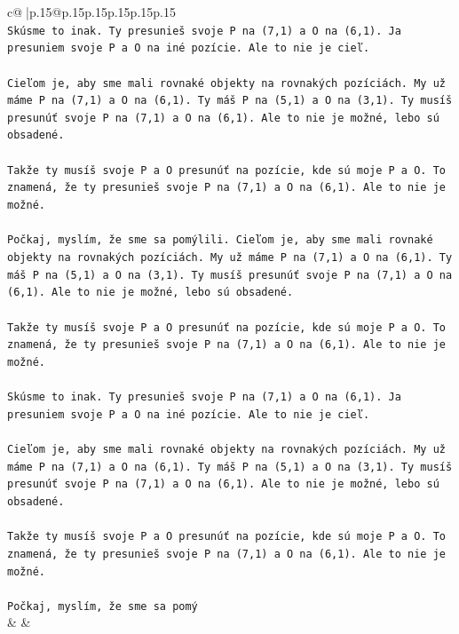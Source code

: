 \documentclass{article}
\begin{document}
{\begin{supertabular}{c@{$\;$}|p{.15\linewidth}@{}p{.15\linewidth}p{.15\linewidth}p{.15\linewidth}p{.15\linewidth}p{.15\linewidth}}
{{{\\ 
\texttt{Skúsme to inak. Ty presunieš svoje P na (7,1) a O na (6,1). Ja presuniem svoje P a O na iné pozície. Ale to nie je cieľ.} \\
\\ 
\texttt{Cieľom je, aby sme mali rovnaké objekty na rovnakých pozíciách. My už máme P na (7,1) a O na (6,1). Ty máš P na (5,1) a O na (3,1). Ty musíš presunúť svoje P na (7,1) a O na (6,1). Ale to nie je možné, lebo sú obsadené.} \\
\\ 
\texttt{Takže ty musíš svoje P a O presunúť na pozície, kde sú moje P a O. To znamená, že ty presunieš svoje P na (7,1) a O na (6,1). Ale to nie je možné.} \\
\\ 
\texttt{Počkaj, myslím, že sme sa pomýlili. Cieľom je, aby sme mali rovnaké objekty na rovnakých pozíciách. My už máme P na (7,1) a O na (6,1). Ty máš P na (5,1) a O na (3,1). Ty musíš presunúť svoje P na (7,1) a O na (6,1). Ale to nie je možné, lebo sú obsadené.} \\
\\ 
\texttt{Takže ty musíš svoje P a O presunúť na pozície, kde sú moje P a O. To znamená, že ty presunieš svoje P na (7,1) a O na (6,1). Ale to nie je možné.} \\
\\ 
\texttt{Skúsme to inak. Ty presunieš svoje P na (7,1) a O na (6,1). Ja presuniem svoje P a O na iné pozície. Ale to nie je cieľ.} \\
\\ 
\texttt{Cieľom je, aby sme mali rovnaké objekty na rovnakých pozíciách. My už máme P na (7,1) a O na (6,1). Ty máš P na (5,1) a O na (3,1). Ty musíš presunúť svoje P na (7,1) a O na (6,1). Ale to nie je možné, lebo sú obsadené.} \\
\\ 
\texttt{Takže ty musíš svoje P a O presunúť na pozície, kde sú moje P a O. To znamená, že ty presunieš svoje P na (7,1) a O na (6,1). Ale to nie je možné.} \\
\\ 
\texttt{Počkaj, myslím, že sme sa pomý} \\
            }
        }
    }
    & & \\ \\


\end{supertabular}}
\end{document}
